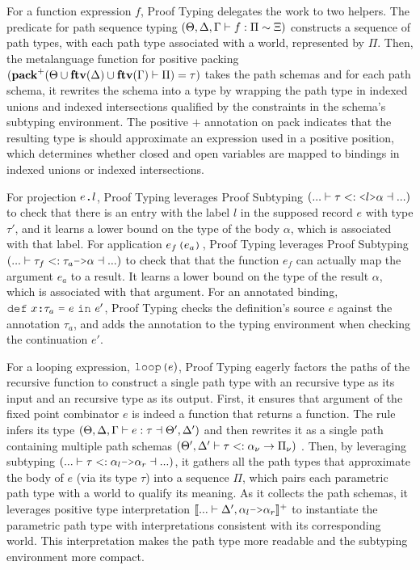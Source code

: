 \documentclass[acmsmall]{acmart}
\theoremstyle{definition}
\begin{document}
For a function expression $f$, Proof Typing 
delegates the work to two helpers. 
The predicate for path sequence typing 
$(\Theta, \Delta, \Gamma \vdash f : \Pi \sim \Xi)$
constructs a sequence of path types, 
with each path type associated with a world, represented by $\Pi$.
Then, the metalanguage function for positive packing 
$(\textbf{pack}^+(\Theta \cup \textbf{ftv}(\Delta) \cup \textbf{ftv}(\Gamma) \vdash \Pi) = \tau)$
takes the path schemas and for each path schema,
it rewrites the schema into a type by wrapping the path type in indexed unions
and indexed intersections qualified by the constraints in the schema's subtyping environment. 
The positive $+$ annotation on pack indicates that the resulting type 
is should approximate an expression used in a positive position,
which determines whether closed and open variables are mapped to
bindings in indexed unions or indexed intersections.

For projection $e\J{.}l$, Proof Typing
leverages Proof Subtyping $(... \entails \tau \subtypes \J{<}l\J{>}\alpha \given ...)$ 
to check that there is an entry with the label $l$ 
in the supposed record $e$ with type $\tau'$, 
and it learns a lower bound 
on the type of the body $\alpha$, which is associated with that label.
For application $e_f\J{(}e_a\J{)}$, Proof Typing
leverages Proof Subtyping $(... \entails \tau_f \subtypes \tau_a \J{->} \alpha \given ...)$
to check that that the function $e_f$ can actually
map the argument $e_a$ to a result. It learns a lower bound 
on the type of the result $\alpha$, which is associated with that argument.
For an annotated binding, $\J{def}\ x \J{:} \tau_a\ \J{=}\ e\ \J{in}\ e'$, 
Proof Typing checks the definition's source $e$ against the annotation $\tau_a$,
and adds the annotation to the typing environment when checking the continuation $e'$.

For a looping expression, $\J{loop(}e{)}$, Proof Typing
eagerly factors the paths of the recursive function 
to construct a single path type with an recursive type as its input and an recursive type as its output. 
First, it ensures that argument of the fixed point combinator $e$ is indeed a 
function that returns a function.
The rule infers its type $(\Theta, \Delta, \Gamma \vdash e : \tau \dashv  \Theta', \Delta')$
and then rewrites it as a single path containing multiple path schemas $(
  \Theta', \Delta' \vdash \tau <: \alpha_\nu \rightarrow \Pi_\nu
)$
. 
Then, by leveraging subtyping $(... \entails \tau \subtypes \alpha_l \J{->} \alpha_r \given ...)$, 
it gathers all the path types that approximate the body of $e$ (via its type $\tau$)
into a sequence $\Pi$, which pairs each parametric path type with a world to qualify its meaning.
As it collects the path schemas, it leverages positive type interpretation 
$\llbracket ... \entails \Delta', \alpha_l \J{->} \alpha_r \rrbracket^+$ 
to instantiate the parametric path type with interpretations consistent with its corresponding world. 
This interpretation makes the path type more readable and the subtyping environment more compact.
\end{document}
